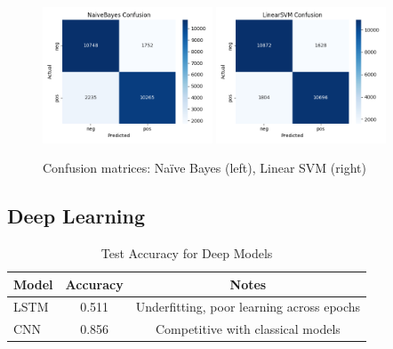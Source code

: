 \documentclass[12pt,a4paper]{article}
\begin{document}
\begin{figure}[H]
  \centering
  \includegraphics[width=0.45\textwidth]{figures/NaiveBayes_confusion.png}
  \includegraphics[width=0.45\textwidth]{figures/LinearSVM_confusion.png}
  \caption{Confusion matrices: Naïve Bayes (left), Linear SVM (right)}
\end{figure}

\subsection{Deep Learning}

\begin{table}[H]
  \centering
  \caption{Test Accuracy for Deep Models}
  \label{tab:dl-results}
  \begin{tabular}{lcc}
    \toprule
    \textbf{Model} & \textbf{Accuracy} & \textbf{Notes} \\
    \midrule
    LSTM & 0.511 & Underfitting, poor learning across epochs \\
    CNN  & 0.856 & Competitive with classical models \\
    \bottomrule
  \end{tabular}
\end{table}
\end{document}
